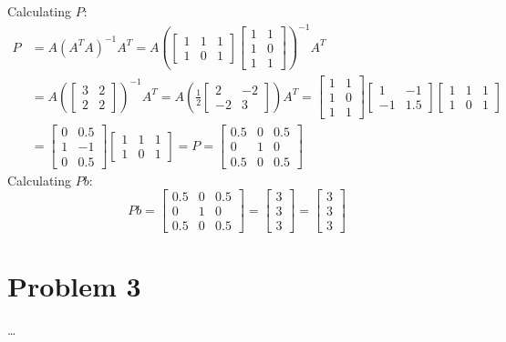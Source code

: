 \documentclass{article}
\begin{document}
Calculating $P:$
\begin{equation*}
    \begin{split}
        P &= A(A^{T}A)^{-1}A^{T}= A(\begin{bmatrix}1&1&1\\1&0&1\end{bmatrix} \begin{bmatrix}1&1\\1&0\\1&1\end{bmatrix})^{-1}A^{T}\\
        &= A (\begin{bmatrix}3&2\\2&2\end{bmatrix})^{-1}A^{T} = A (\frac{1}{2}\begin{bmatrix}2&-2\\-2&3\end{bmatrix}) A^{T} = \begin{bmatrix}1&1\\1&0\\1&1\end{bmatrix}\begin{bmatrix}1&-1\\-1&1.5\end{bmatrix} \begin{bmatrix}1&1&1\\1&0&1\end{bmatrix}\\
        &= \begin{bmatrix}0&0.5\\1&-1\\0&0.5\end{bmatrix}\begin{bmatrix}1&1&1\\1&0&1\end{bmatrix} = P = \begin{bmatrix}0.5&0&0.5\\0&1&0\\0.5&0&0.5\end{bmatrix}
    \end{split}
\end{equation*}
Calculating $Pb$:
$$Pb = \begin{bmatrix}0.5&0&0.5\\0&1&0\\0.5&0&0.5\end{bmatrix} = \begin{bmatrix}3\\3\\3\end{bmatrix} = \begin{bmatrix}3\\3\\3\end{bmatrix} $$

\pagebreak
\section*{Problem 3}
\dots
\end{document}
